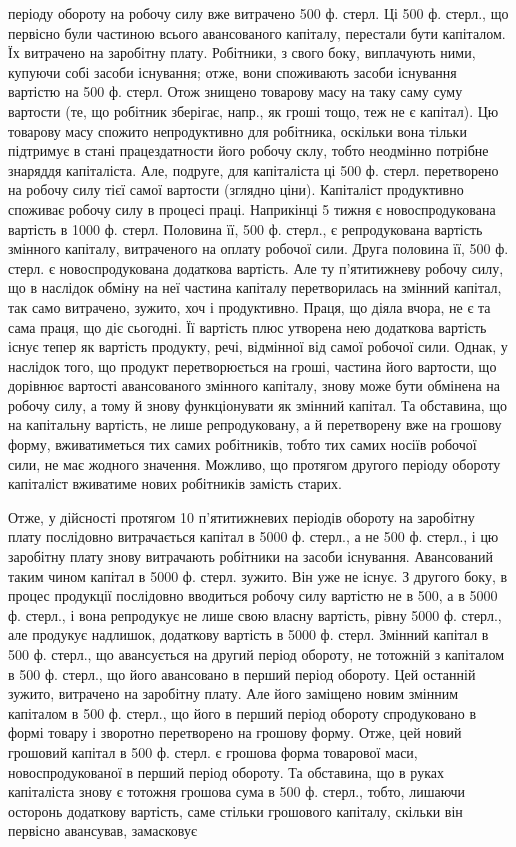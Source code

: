 \parcont{}  %
періоду обороту на робочу силу вже витрачено 500 ф. стерл. Ці 500 ф. стерл.,
що первісно були частиною всього авансованого капіталу, перестали бути
капіталом. Їх витрачено на заробітну плату. Робітники, з свого боку,
виплачують ними, купуючи собі засоби існування; отже, вони споживають
засоби існування вартістю на 500 ф. стерл. Отож знищено товарову
масу на таку саму суму вартости (те, що робітник зберігає, напр., як
гроші тощо, теж не є капітал). Цю товарову масу спожито непродуктивно
для робітника, оскільки вона тільки підтримує в стані працездатности
його робочу склу, тобто неодмінно потрібне знаряддя капіталіста. Але,
подруге, для капіталіста ці 500 ф. стерл. перетворено на робочу силу тієї
самої вартости (зглядно ціни). Капіталіст продуктивно споживає робочу
силу в процесі праці. Наприкінці 5 тижня є новоспродукована вартість
в 1000 ф. стерл. Половина її, 500 ф. стерл., є репродукована вартість змінного
капіталу, витраченого на оплату робочої сили. Друга половина її,
500 ф. стерл. є новоспродукована додаткова вартість. Але ту п’ятитижневу
робочу силу, що в наслідок обміну на неї частина капіталу перетворилась
на змінний капітал, так само витрачено, зужито, хоч і продуктивно.
Праця, що діяла вчора, не є та сама праця, що діє сьогодні. Її
вартість плюс утворена нею додаткова вартість існує тепер як вартість
продукту, речі, відмінної від самої робочої сили. Однак, у наслідок того,
що продукт перетворюється на гроші, частина його вартости, що дорівнює
вартості авансованого змінного капіталу, знову може бути
обмінена на робочу силу, а тому й знову функціонувати як змінний капітал.
Та обставина, що на капітальну вартість, не лише репродуковану,
а й перетворену вже на грошову форму, вживатиметься тих самих робітників,
тобто тих самих носіїв робочої сили, не має жодного значення.
Можливо, що протягом другого періоду обороту капіталіст вживатиме
нових робітників замість старих.

Отже, у дійсності протягом 10 п’ятитижневих періодів обороту на
заробітну плату послідовно витрачається капітал в 5000 ф. стерл., а
не 500 ф. стерл., і цю заробітну плату знову витрачають робітники
на засоби існування. Авансований таким чином капітал в 5000
ф. стерл. зужито. Він уже не існує. З другого боку, в процес продукції
послідовно вводиться робочу силу вартістю не в 500, а в 5000 ф. стерл.,
і вона репродукує не лише свою власну вартість, рівну 5000 ф. стерл.,
але продукує надлишок, додаткову вартість в 5000 ф. стерл. Змінний
капітал в 500 ф. стерл., що авансується на другий період обороту, не тотожній
з капіталом в 500 ф. стерл., що його авансовано в перший період
обороту. Цей останній зужито, витрачено на заробітну плату. Але його
заміщено новим змінним капіталом в 500 ф. стерл., що його в перший
період обороту спродуковано в формі товару і зворотно перетворено
на грошову форму. Отже, цей новий грошовий капітал в 500 ф. стерл. є
грошова форма товарової маси, новоспродукованої в перший період обороту.
Та обставина, що в руках капіталіста знову є тотожня грошова
сума в 500 ф. стерл., тобто, лишаючи осторонь додаткову вартість, саме
стільки грошового капіталу, скільки він первісно авансував, замасковує
\parbreak{}  %
